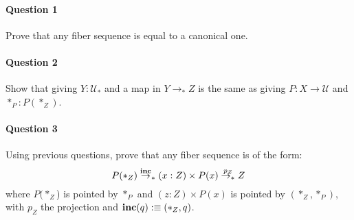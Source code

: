 \documentclass{article}[6pt]%
\newcommand{\U}{{\mathcal U}}
\renewcommand{\r}{\rightarrow}
\newcommand{\inc}{\mathrm{\bf inc}}
\begin{document}
\begin{Exercise}[title={Canonical fiber sequence},difficulty=1]

\paragraph{Question 1} Prove that any fiber sequence is equal to a canonical one.

\paragraph{Question 2} Show that giving $Y:\U_*$ and a map in $Y\r_* Z$ is the same as giving $P:X\r \U$ and $*_P:P(*_Z)$.

\paragraph{Question 3} Using previous questions, prove that any fiber sequence is of the form:
 \[P(*_Z) \overset{\inc}\r_* (x:Z)\times P(x)\overset{p_Z}{\r_*} Z\]
 where $P(*_Z$) is pointed by $*_P$ and $(z:Z)\times P(x)$ is pointed by $(*_Z,*_P)$, with $p_Z$ the projection and $\inc(q):\equiv (*_Z,q)$.
\end{Exercise}
\end{document}
